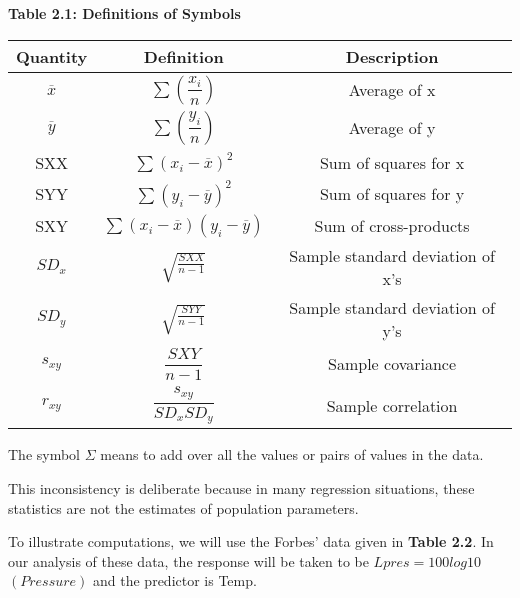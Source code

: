 \documentclass{article}
\begin{document}
    \begin{center}
        \textbf{Table 2.1: Definitions of Symbols}
        \begin{tabular}{|c|c|c|}
            \hline 
            Quantity & Definition & Description\\ 
            \hline 
            $\overline{x}$ & ${\displaystyle \sum \left(\dfrac{x_{i}}{n}\right)}$ & Average of x \\  
            \hline 
            $\overline{y}$ & ${\displaystyle \sum \left(\dfrac{y_{i}}{n}\right)}$ & Average of y \\
            \hline 
            SXX & ${\displaystyle \sum {\left(x_{i} - \overline{x}\right)}^2}$ & Sum of squares for x \\
            \hline 
            SYY & ${\displaystyle \sum {\left(y_{i} - \overline{y}\right)}^2}$ & Sum of squares for y \\
            \hline
            SXY & ${\displaystyle \sum (x_{i} - \overline{x})(y_{i} - \overline{y})}$ & Sum of cross-products \\
            \hline
            ${SD_{x}}$ & ${\sqrt{\frac{SXX}{n - 1}}}$ & Sample standard deviation of x’s \\
            \hline 
            ${SD_{y}}$ & ${\sqrt{\frac{SYY}{n - 1}}}$ & Sample standard deviation of y’s \\
            \hline 
            ${s_{xy}}$ & ${\dfrac{SXY}{n - 1}}$ & Sample covariance \\ 
            \hline 
            ${r_{xy}}$ & ${\dfrac{s_{xy}}{SD_{x} SD_{y}}}$ & Sample correlation \\ 
            \hline
        \end{tabular}
        
        \vspace{\baselineskip}
        The symbol ${\Sigma}$  means to add over all the values or pairs of values in the data. 
    \end{center}
    
    This inconsistency is deliberate because in many regression situations, these statistics are not the estimates of population parameters. 
    
    To illustrate computations, we will use the Forbes’ data given in \textbf{Table 2.2}. In our analysis of these data, the response will be taken to be ${Lpres = 100log10}$ ${(Pressure)}$ and the predictor is Temp.
    
\end{document}
